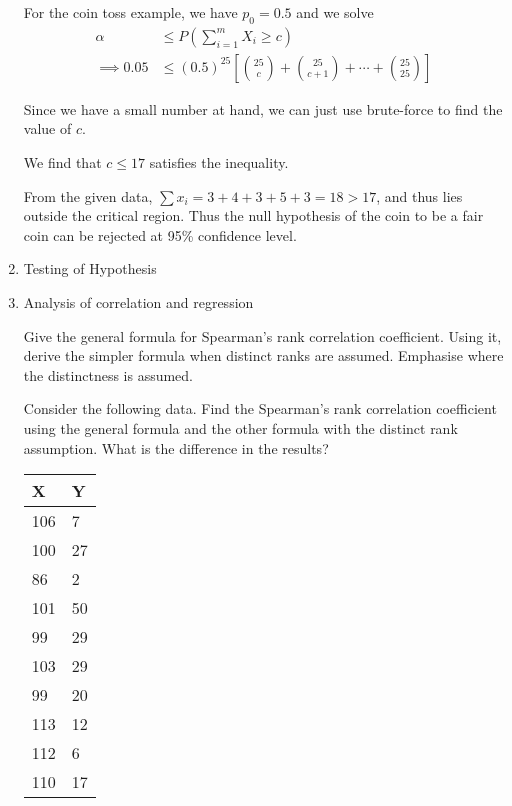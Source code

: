 \documentclass[12pt, oneside]{article}
\begin{document}
\begin{enumerate}
{    For the coin toss example, we have \(p_0 = 0.5\) and we solve
    \begin{align*}
        \alpha &\leq P\left(\sum_{i=1}^{m} X_i \geq c\right) \\
        \implies 0.05 &\leq (0.5)^{25} \left[ {25 \choose c} + {25 \choose {c + 1}} + \cdots + {25 \choose 25} \right]
    \end{align*}

    Since we have a small number at hand, we can just use brute-force to find the value of \(c\).

    We find that \(c \leq 17\) satisfies the inequality.

    From the given data, \(\sum x_i = 3 + 4 + 3 + 5 + 3 = 18 > 17\), and thus lies outside
    the critical region. Thus the null hypothesis of the coin to be a fair coin can
    be rejected at 95\% confidence level.
}


\item	 Testing of Hypothesis


\item {
    Analysis of correlation and regression 

    Give the general formula for Spearman's rank correlation coefficient. Using it,
    derive the simpler formula when distinct ranks are assumed. Emphasise where the
    distinctness is assumed.

    Consider the following data. Find the Spearman's rank correlation coefficient
    using the general formula and the other formula with the distinct rank assumption.
    What is the difference in the results?

    \begin{center}
    \begin{tabular}{ | l | l | }
        \hline
        \textbf{X} & \textbf{Y} \\
        \hline
        106 &	7 \\
        100 &  	27 \\
        86 & 2 \\
        101 &	50 \\
        99 &	29 \\
        103 &	29 \\
        99 &	20 \\
        113 &	12 \\
        112 &	6 \\
        110 &	17 \\
        \hline
    \end{tabular}
    \end{center}

}
\end{enumerate}
\end{document}
